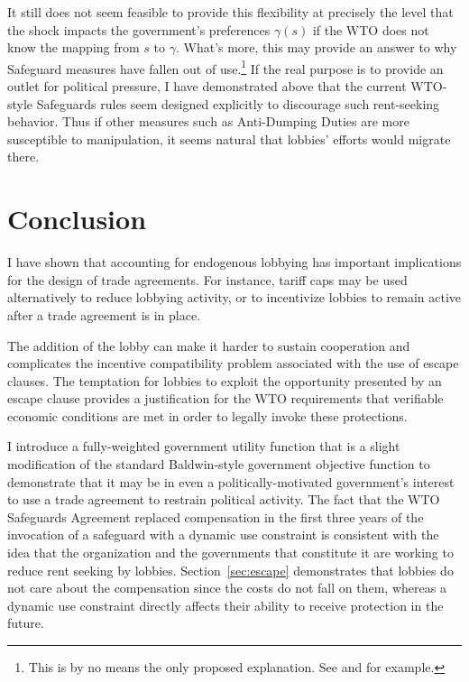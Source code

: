 \documentclass[12pt,titlepage]{article}
\newcommand{\ga}{\gamma}
\begin{document}
It still does not seem feasible to provide this flexibility at precisely the level that the shock impacts the government's preferences $\ga(s)$ if the WTO does not know the mapping from $s$ to $\ga$. What's more, this may provide an answer to why Safeguard measures have fallen out of use.\footnote{This is by no means the only proposed explanation. See \Textcite{bown2002s} and \Textcite{sykes2003} for example.} If the real purpose is to provide an outlet for political pressure, I have demonstrated above that the current WTO-style Safeguards rules seem designed explicitly to discourage such rent-seeking behavior. Thus if other measures such as Anti-Dumping Duties are more susceptible to manipulation, it seems natural that lobbies' efforts would migrate there.

	


%

\section{Conclusion}
\label{sec:concl}
I have shown that accounting for endogenous lobbying has important implications for the design of trade agreements. For instance, tariff caps may be used alternatively to reduce lobbying activity, or to incentivize lobbies to remain active after a trade agreement is in place.

The addition of the lobby can make it harder to sustain cooperation and complicates the incentive compatibility problem associated with the use of escape clauses. The temptation for lobbies to exploit the opportunity presented by an escape clause provides a justification for the WTO requirements that verifiable economic conditions are met in order to legally invoke these protections.

I introduce a fully-weighted government utility function that is a slight modification of the standard Baldwin-style government objective function to demonstrate that it may be in even a politically-motivated government's interest to use a trade agreement to restrain political activity. The fact that the WTO Safeguards Agreement replaced compensation in the first three years of the invocation of a safeguard with a dynamic use constraint is consistent with the idea that the organization and the governments that constitute it are working to reduce rent seeking by lobbies. Section~\ref{sec:escape} demonstrates that lobbies do not care about the compensation since the costs do not fall on them, whereas a dynamic use constraint directly affects their ability to receive protection in the future.
\end{document}

